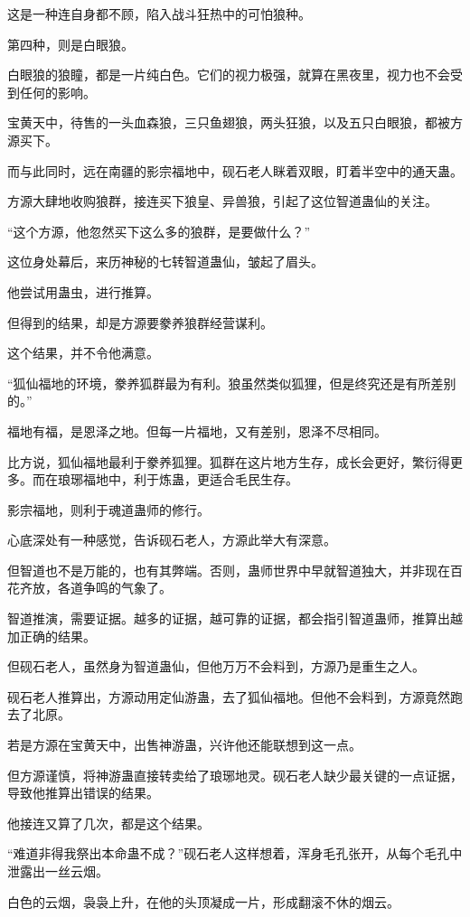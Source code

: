 \begin{this_body}
这是一种连自身都不顾，陷入战斗狂热中的可怕狼种。

第四种，则是白眼狼。

白眼狼的狼瞳，都是一片纯白色。它们的视力极强，就算在黑夜里，视力也不会受到任何的影响。

宝黄天中，待售的一头血森狼，三只鱼翅狼，两头狂狼，以及五只白眼狼，都被方源买下。

而与此同时，远在南疆的影宗福地中，砚石老人眯着双眼，盯着半空中的通天蛊。

方源大肆地收购狼群，接连买下狼皇、异兽狼，引起了这位智道蛊仙的关注。

“这个方源，他忽然买下这么多的狼群，是要做什么？”

这位身处幕后，来历神秘的七转智道蛊仙，皱起了眉头。

他尝试用蛊虫，进行推算。

但得到的结果，却是方源要豢养狼群经营谋利。

这个结果，并不令他满意。

“狐仙福地的环境，豢养狐群最为有利。狼虽然类似狐狸，但是终究还是有所差别的。”

福地有福，是恩泽之地。但每一片福地，又有差别，恩泽不尽相同。

比方说，狐仙福地最利于豢养狐狸。狐群在这片地方生存，成长会更好，繁衍得更多。而在琅琊福地中，利于炼蛊，更适合毛民生存。

影宗福地，则利于魂道蛊师的修行。

心底深处有一种感觉，告诉砚石老人，方源此举大有深意。

但智道也不是万能的，也有其弊端。否则，蛊师世界中早就智道独大，并非现在百花齐放，各道争鸣的气象了。

智道推演，需要证据。越多的证据，越可靠的证据，都会指引智道蛊师，推算出越加正确的结果。

但砚石老人，虽然身为智道蛊仙，但他万万不会料到，方源乃是重生之人。

砚石老人推算出，方源动用定仙游蛊，去了狐仙福地。但他不会料到，方源竟然跑去了北原。

若是方源在宝黄天中，出售神游蛊，兴许他还能联想到这一点。

但方源谨慎，将神游蛊直接转卖给了琅琊地灵。砚石老人缺少最关键的一点证据，导致他推算出错误的结果。

他接连又算了几次，都是这个结果。

“难道非得我祭出本命蛊不成？”砚石老人这样想着，浑身毛孔张开，从每个毛孔中泄露出一丝云烟。

白色的云烟，袅袅上升，在他的头顶凝成一片，形成翻滚不休的烟云。


\end{this_body}

